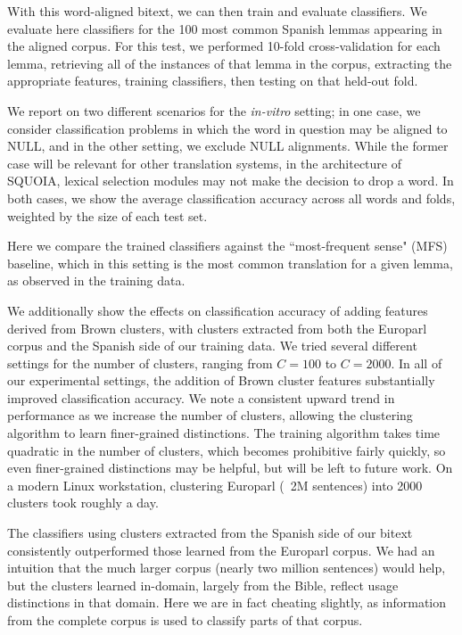 With this word-aligned bitext, we can then train and evaluate classifiers.
We evaluate here classifiers for the 100 most common Spanish lemmas appearing
in the aligned corpus. For this test, we performed 10-fold cross-validation for
each lemma, retrieving all of the instances of that lemma in the corpus,
extracting the appropriate features, training classifiers, then testing on
that held-out fold.

We report on two different scenarios for the \emph{in-vitro} setting; in one
case, we consider classification problems in which the word in question may be
aligned to NULL, and in the other setting, we exclude NULL alignments. While
the former case will be relevant for other translation systems, in the
architecture of SQUOIA, lexical selection modules may not make the decision to
drop a word. In both cases, we show the average classification accuracy across
all words and folds, weighted by the size of each test set.

Here we compare the trained classifiers against the ``most-frequent sense"
(MFS) baseline, which in this setting is the most common translation for a
given lemma, as observed in the training data.

We additionally show the effects on classification accuracy of adding features
derived from Brown clusters, with clusters extracted from both the Europarl
corpus and the Spanish side of our training data.
We tried several different
settings for the number of clusters, ranging from $C=100$ to $C=2000$.
In all of our experimental settings, the addition of Brown cluster features
substantially improved classification accuracy. We note a consistent upward
trend in performance as we increase the number of clusters, allowing the
clustering algorithm to learn finer-grained distinctions.
The training algorithm takes time quadratic in the number of clusters,
which becomes prohibitive fairly quickly, so even finer-grained distinctions
may be helpful, but will be left to future work. On a modern Linux
workstation, clustering Europarl (~2M sentences) into 2000 clusters took
roughly a day.

The classifiers using clusters extracted from the Spanish side of our bitext
consistently outperformed those learned from the Europarl corpus. We had an
intuition that the much larger corpus (nearly two million sentences) would
help, but the clusters learned in-domain, largely from the Bible, reflect
usage distinctions in that domain. Here we are in fact cheating slightly, as
information from the complete corpus is used to classify parts of that corpus.


